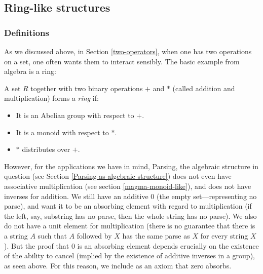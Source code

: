 \subsection{Ring-like structures}
\subsubsection{Definitions}
As we discussed above, in Section \ref{two-operators}, when one has two operations on a set, one often wants them to interact sensibly. The basic example from algebra is a ring:
\begin{Definition}
A set $R$ together with two binary operations $+$ and $*$ (called addition and multiplication) forms a \emph{ring} if:
\begin{itemize}
\item It is an Abelian group with respect to $+$.
\item It is a monoid with respect to $*$.
\item $*$ distributes over $+$.
\end{itemize}
\end{Definition}
However, for the applications we have in mind, Parsing, the algebraic structure in question (see Section \ref{Parsing-as-algebraic structure}) does not even have associative multiplication (see section \ref{magma-monoid-like}), and does not have inverses for addition. We still have an additive $0$ (the empty set---representing no parse), and want it to be an absorbing element with regard to multiplication (if the left, say, substring has no parse, then the whole string has no parse). We also do not have a unit element for multiplication (there is no guarantee that there is a string $A$ such that $A$ followed by $X$ has the same parse as $X$ for every string $X$). But the proof that $0$ is an absorbing element depends crucially on the existence of the ability to cancel (implied by the existence of additive inverses in a group), as seen above. For this reason, we include as an axiom that zero absorbs.

